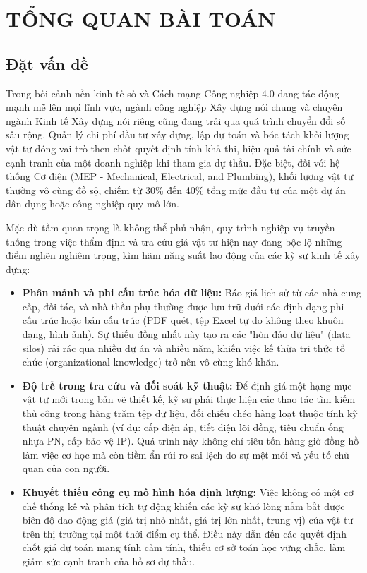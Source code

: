 \chapter{TỔNG QUAN BÀI TOÁN}
\label{ch:chuong1}

\section{Đặt vấn đề}
Trong bối cảnh nền kinh tế số và Cách mạng Công nghiệp 4.0 đang tác động mạnh mẽ lên mọi lĩnh vực, ngành công nghiệp Xây dựng nói chung và chuyên ngành Kinh tế Xây dựng nói riêng cũng đang trải qua quá trình chuyển đổi số sâu rộng. Quản lý chi phí đầu tư xây dựng, lập dự toán và bóc tách khối lượng vật tư đóng vai trò then chốt quyết định tính khả thi, hiệu quả tài chính và sức cạnh tranh của một doanh nghiệp khi tham gia dự thầu. Đặc biệt, đối với hệ thống Cơ điện (MEP - Mechanical, Electrical, and Plumbing), khối lượng vật tư thường vô cùng đồ sộ, chiếm từ 30\% đến 40\% tổng mức đầu tư của một dự án dân dụng hoặc công nghiệp quy mô lớn.

Mặc dù tầm quan trọng là không thể phủ nhận, quy trình nghiệp vụ truyền thống trong việc thẩm định và tra cứu giá vật tư hiện nay đang bộc lộ những điểm nghẽn nghiêm trọng, kìm hãm năng suất lao động của các kỹ sư kinh tế xây dựng:
\begin{itemize}
    \item \textbf{Phân mảnh và phi cấu trúc hóa dữ liệu:} Báo giá lịch sử từ các nhà cung cấp, đối tác, và nhà thầu phụ thường được lưu trữ dưới các định dạng phi cấu trúc hoặc bán cấu trúc (PDF quét, tệp Excel tự do không theo khuôn dạng, hình ảnh). Sự thiếu đồng nhất này tạo ra các "hòn đảo dữ liệu" (data silos) rải rác qua nhiều dự án và nhiều năm, khiến việc kế thừa tri thức tổ chức (organizational knowledge) trở nên vô cùng khó khăn.
    \item \textbf{Độ trễ trong tra cứu và đối soát kỹ thuật:} Để định giá một hạng mục vật tư mới trong bản vẽ thiết kế, kỹ sư phải thực hiện các thao tác tìm kiếm thủ công trong hàng trăm tệp dữ liệu, đối chiếu chéo hàng loạt thuộc tính kỹ thuật chuyên ngành (ví dụ: cấp điện áp, tiết diện lõi đồng, tiêu chuẩn ống nhựa PN, cấp bảo vệ IP). Quá trình này không chỉ tiêu tốn hàng giờ đồng hồ làm việc cơ học mà còn tiềm ẩn rủi ro sai lệch do sự mệt mỏi và yếu tố chủ quan của con người.
    \item \textbf{Khuyết thiếu công cụ mô hình hóa định lượng:} Việc không có một cơ chế thống kê và phân tích tự động khiến các kỹ sư khó lòng nắm bắt được biên độ dao động giá (giá trị nhỏ nhất, giá trị lớn nhất, trung vị) của vật tư trên thị trường tại một thời điểm cụ thể. Điều này dẫn đến các quyết định chốt giá dự toán mang tính cảm tính, thiếu cơ sở toán học vững chắc, làm giảm sức cạnh tranh của hồ sơ dự thầu.
\end{itemize}

